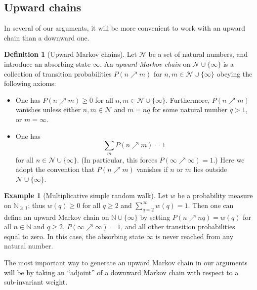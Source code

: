 \documentclass[12pt]{amsart}
\theoremstyle{definition}
\newtheorem{definition}[theorem]{Definition}
\newtheorem{example}[theorem]{Example}
\theoremstyle{remark}
\numberwithin{equation}{section}
\newcommand{\N}{{\mathbb N}}
\newcommand{\1}{{\mathbf 1}}
\begin{document}
\subsection{Upward chains}

In several of our arguments, it will be more convenient to work with an upward chain than a downward one.

\begin{definition}[Upward Markov chains]\label{up-markov}  
Let ${\mathcal N}$ be a set of natural numbers, and introduce an absorbing state $\infty$.  An \emph{upward Markov chain} on ${\mathcal N} \cup \{\infty\}$ is a collection of transition probabilities $P(n \nearrow m)$ for $n,m \in {\mathcal N} \cup \{\infty\}$ obeying the following axioms:
\begin{itemize}
    \item[(i)] One has $P(n \nearrow m) \geq 0$ for all $n,m \in {\mathcal N} \cup \{\infty\}$.  Furthermore, $P(n \nearrow m)$ vanishes unless either $n, m \in {\mathcal N}$ and $m = nq$ for some natural number $q>1$, or $m = \infty$.
    \item[(ii)]  One has
\begin{equation}\label{nearrow}
\sum_m P(n \nearrow m) = 1
\end{equation}
    for all $n \in {\mathcal N} \cup \{\infty\}$.  (In particular, this forces $P(\infty \nearrow \infty) = 1$.) Here we adopt the convention that $P(n \nearrow m)$ vanishes if $n$ or $m$ lies outside ${\mathcal N} \cup \{\infty\}$.
\end{itemize}
\end{definition}

\begin{example}[Multiplicative simple random walk]\label{msrw}  Let $w$ be a probability measure on $\N_{\geq 1}$; thus $w(q) \geq 0$ for all $q \geq 2$ and $\sum_{q=2}^\infty w(q)=1$.  Then one can define an upward Markov chain on $\N \cup \{\infty\}$ by setting $P(n \nearrow nq) = w(q)$ for all $n \in \N$ and $q \geq 2$, $P(\infty \nearrow \infty)=1$, and all other transition probabilities equal to zero.  In this case, the absorbing state $\infty$ is never reached from any natural number.
\end{example}

The most important way to generate an upward Markov chain in our arguments will be by taking an ``adjoint'' of a downward Markov chain with respect to a sub-invariant weight.
\end{document}
